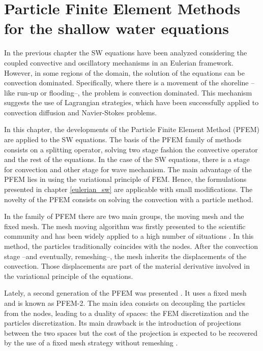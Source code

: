 
\chapter{Particle Finite Element Methods for the shallow water equations}
\label{lagrangian_sw}




In the previous chapter the SW equations have been analyzed considering the coupled convective and oscillatory mechanisms in an Eulerian framework. However, in some regions of the domain, the solution of the equations can be convection dominated. Specifically, where there is a movement of the shoreline --like run-up or flooding--, the problem is convection dominated.
This mechanism suggests the use of Lagrangian strategies, which have been successfully applied to convection diffusion and Navier-Stokes problems.

In this chapter, the developments of the Particle Finite Element Method (PFEM) are applied to the SW equations. The basis of the PFEM family of methods consists on a splitting operator, solving two stage fashion the convective operator and the rest of the equations. In the case of the SW equations, there is a stage for convection and other stage for wave mechanism.
The main advantage of the PFEM lies in using the variational principle of FEM. Hence, the formulations presented in chapter \ref{eulerian_sw} are applicable with small modifications. The novelty of the PFEM consists on solving the convection with a particle method.

In the family of PFEM there are two main groups, the moving mesh and the fixed mesh. The mesh moving algorithm was firstly presented to the scientific community \cite{idelsohn2003,PFEM2004} and has been widely applied to a high number of situations \cite{larese2008,Salazar2012,onate2008}. In this method, the particles traditionally coincides with the nodes. After the convection stage --and eventually, remeshing--, the mesh inherits the displacements of the convection. Those displacements are part of the material derivative involved in the variational principle of the equations.

Lately, a second generation of the PFEM was presented \cite{idelsohn2012}. It uses a fixed mesh and is known as PFEM-2. The main idea consists on decoupling the particles from the nodes, leading to a duality of spaces: the FEM discretization and the particles discretization. Its main drawback is the introduction of projections between the two spaces but the cost of the projection is expected to be recovered by the use of a fixed mesh strategy without remeshing \cite{idelsohn2015,puigferrat2021}.




